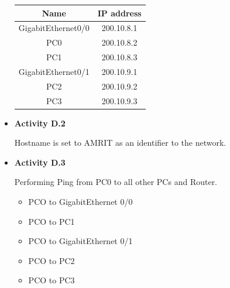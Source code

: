 \documentclass[a4paper,12pt]{article}
\begin{document}
\begin{itemize}
            \begin{table}[H]
                  \centering
                  \begin{tabular}{|c|c|}
                        \hline
                        \textbf{Name}      & \textbf{IP address} \\
                        \hline
                        GigabitEthernet0/0 & 200.10.8.1          \\
                        \hline
                        PC0                & 200.10.8.2          \\
                        \hline
                        PC1                & 200.10.8.3          \\
                        \hline
                        GigabitEthernet0/1 & 200.10.9.1          \\
                        \hline
                        PC2                & 200.10.9.2          \\
                        \hline
                        PC3                & 200.10.9.3          \\
                        \hline
                  \end{tabular}
            \end{table}
      \item \textbf{Activity D.2}

            Hostname is set to AMRIT as an identifier to the network.

      \item \textbf{Activity D.3}

            Performing Ping from PC0 to all other PCs and Router.
            \begin{itemize}
                  \item PCO to GigabitEthernet 0/0
                  \item PCO to PC1
                  \item PCO to GigabitEthernet 0/1
                  \item PCO to PC2
                  \item PCO to PC3
            \end{itemize}


\end{itemize}
\end{document}
